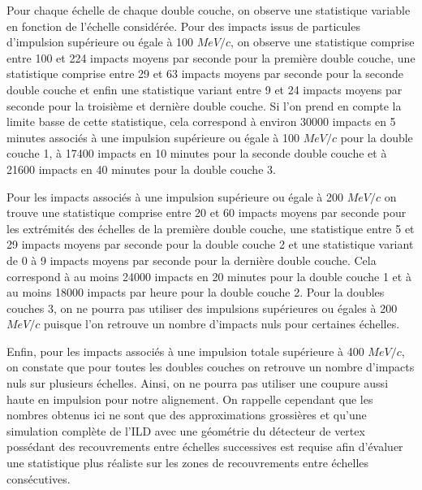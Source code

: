   \medskip
  
  Pour chaque \'echelle de chaque double couche, on observe une statistique variable en fonction de l'\'echelle consid\'er\'ee. Pour des impacts issus de particules d'impulsion sup\'erieure ou \'egale \`a 100 $MeV/c$, on observe une statistique comprise entre 100 et 224 impacts moyens par seconde pour la premi\`ere double couche, une statistique comprise entre 29 et 63 impacts moyens par seconde pour la seconde double couche et enfin une statistique variant entre 9 et 24 impacts moyens par seconde pour la troisi\`eme et derni\`ere double couche. Si l'on prend en compte la limite basse de cette statistique, cela correspond \`a environ 30000 impacts en 5 minutes associ\'es \`a une impulsion sup\'erieure ou \'egale \`a 100 $MeV/c$ pour la double couche 1, \`a 17400 impacts en 10 minutes pour la seconde double couche et \`a 21600 impacts en 40 minutes pour la double couche 3.
  
  \medskip
    
  Pour les impacts associ\'es \`a une impulsion sup\'erieure ou \'egale \`a 200 $MeV/c$ on trouve une statistique comprise entre 20 et 60 impacts moyens par seconde pour les extr\'emit\'es des \'echelles de la premi\`ere double couche, une statistique entre 5 et 29 impacts moyens par seconde pour la double couche 2 et une statistique variant de 0 \`a 9 impacts moyens par seconde pour la derni\`ere double couche. Cela correspond \`a au moins 24000 impacts en 20 minutes pour la double couche 1 et \`a au moins 18000 impacts par heure pour la double couche 2. Pour la doubles couches 3, on ne pourra pas utiliser des impulsions sup\'erieures ou \'egales \`a 200 $MeV/c$ puisque l'on retrouve un nombre d'impacts nuls pour certaines \'echelles.
  
  \medskip
  
  Enfin, pour les impacts associ\'es \`a une impulsion totale sup\'erieure \`a 400 $MeV/c$, on constate que pour toutes les doubles couches on retrouve un nombre d'impacts nuls sur plusieurs \'echelles. Ainsi, on ne pourra pas utiliser une coupure aussi haute en impulsion pour notre alignement. On rappelle cependant que les nombres obtenus ici ne sont que des approximations grossi\`eres et qu'une simulation compl\`ete de l'ILD avec une g\'eom\'etrie du détecteur de vertex poss\'edant des recouvrements entre échelles successives est requise afin d'\'evaluer une statistique plus r\'ealiste sur les zones de recouvrements entre \'echelles cons\'ecutives.
  
  \medskip

